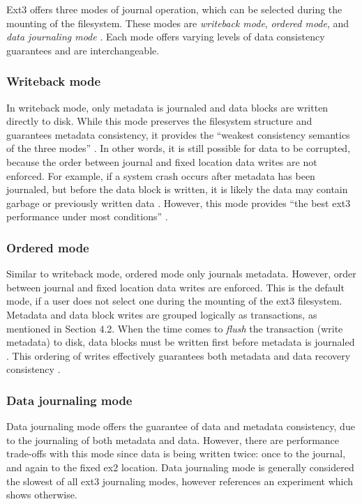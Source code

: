Ext3 offers three modes of journal operation, which can be selected during the mounting of the filesystem. These modes are \emph{writeback mode}, \emph{ordered mode}, and \emph{data journaling mode} \citep{Prabhakaran2005a, Jones2008}. Each mode offers varying levels of data consistency guarantees and are interchangeable.

\subsubsection{Writeback mode}

In writeback mode, only metadata is journaled and data blocks are written directly to disk. While this mode preserves the filesystem structure and guarantees metadata consistency, it provides the ``weakest consistency semantics of the three modes'' \citep[p. 108]{Prabhakaran2005a}. In other words, it is still possible for data to be corrupted, because the order between journal and fixed location data writes are not enforced. For example, if a system crash occurs after metadata has been journaled, but before the data block is written, it is likely the data may contain garbage or previously written data \citep{Jones2008, Prabhakaran2005a}. However, this mode provides ``the best ext3 performance under most conditions'' \citep[p. 2]{Robbins2001b}.

\subsubsection{Ordered mode}

Similar to writeback mode, ordered mode only journals metadata. However, order between journal and fixed location data writes are enforced. This is the default mode, if a user does not select one during the mounting of the ext3 filesystem. Metadata and data block writes are grouped logically as transactions, as mentioned in Section 4.2. When the time comes to \emph{flush} the transaction (write metadata) to disk, data blocks must be written first before metadata is journaled \citep{Robbins2001b}. This ordering of writes effectively guarantees both metadata and data recovery consistency \citep{Jones2008, Prabhakaran2005a}.

\subsubsection{Data journaling mode}

Data journaling mode offers the guarantee of data and metadata consistency, due to the journaling of both metadata and data. However, there are performance trade-offs with this mode since data is being written twice: once to the journal, and again to the fixed ex2 location. Data journaling mode is generally considered the slowest of all ext3 journaling modes, however \citet[p. 3]{Robbins2001b} references an experiment which shows otherwise.